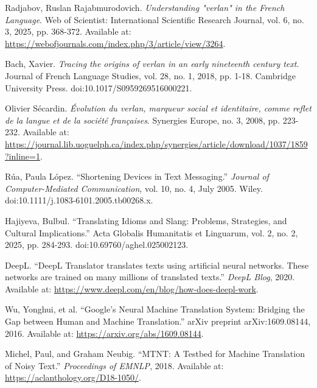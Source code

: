 \documentclass[12pt]{article}
\begin{document}

\newpage
\begin{thebibliography}{9}

Radjabov, Ruslan Rajabmurodovich. \textit{Understanding "verlan" in the French Language}. 
Web of Scientist: International Scientific Research Journal, vol. 6, no. 3, 2025, pp. 368-372. 
Available at: \url{https://webofjournals.com/index.php/3/article/view/3264}.

Bach, Xavier. \textit{Tracing the origins of verlan in an early nineteenth century text}. 
Journal of French Language Studies, vol. 28, no. 1, 2018, pp. 1-18. 
Cambridge University Press. doi:10.1017/S0959269516000221.

Olivier Sécardin. \textit{Évolution du verlan, marqueur social et identitaire, comme reflet de la langue et de la société françaises}. 
Synergies Europe, no. 3, 2008, pp. 223-232. 
Available at: \url{https://journal.lib.uoguelph.ca/index.php/synergies/article/download/1037/1859?inline=1}.

Rúa, Paula López. “Shortening Devices in Text Messaging.” 
\textit{Journal of Computer-Mediated Communication}, vol. 10, no. 4, July 2005. 
Wiley. doi:10.1111/j.1083-6101.2005.tb00268.x.

Hajiyeva, Bulbul. “Translating Idioms and Slang: Problems, Strategies, and Cultural Implications.”  
Acta Globalis Humanitatis et Linguarum, vol. 2, no. 2, 2025, pp. 284-293. doi:10.69760/aghel.025002123.  

DeepL. “DeepL Translator translates texts using artificial neural networks. These networks are trained on many millions of translated texts.” 
\textit{DeepL Blog}, 2020. Available at: \url{https://www.deepl.com/en/blog/how-does-deepl-work}.

Wu, Yonghui, et al. “Google's Neural Machine Translation System: Bridging the Gap between Human and Machine Translation.” 
arXiv preprint arXiv:1609.08144, 2016. Available at: \url{https://arxiv.org/abs/1609.08144}.

Michel, Paul, and Graham Neubig. “MTNT: A Testbed for Machine Translation of Noisy Text.”
\textit{Proceedings of EMNLP}, 2018. Available at: \url{https://aclanthology.org/D18-1050/}.


\end{thebibliography}
\end{document}
